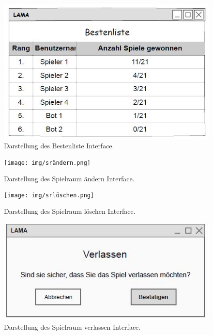 \begin{figure}[h]
	\centering
	\includegraphics[width=\textwidth]{img/Bestenliste.JPG}
	\caption{Darstellung des Bestenliste Interface.}
	\label{gui:bestenliste} %
\end{figure}

\begin{figure}[h]
	\centering
	\texttt{[image: img/srändern.png]}
	\caption{Darstellung des Spielraum ändern Interface.}
	\label{gui:srändern} %
\end{figure}

\begin{figure}[h]
	\centering
	\texttt{[image: img/srlöschen.png]}
	\caption{Darstellung des Spielraum löschen Interface.}
	\label{gui:srlöschen} %
\end{figure}

\begin{figure}[h]
	\centering
	\includegraphics[width=\textwidth]{img/verlassen.JPG}
	\caption{Darstellung des Spielraum verlassen Interface.}
	\label{gui:verlassen} %
\end{figure}

